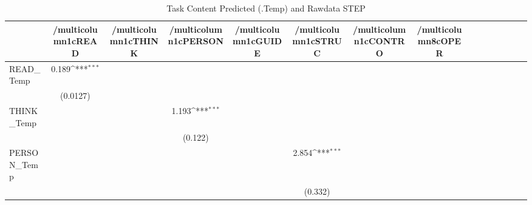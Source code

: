 \begin{table}[htbp]\centering
\def\sym#1{\ifmmode^{#1}\else\(^{#1}\)\fi}
\caption{Task Content Predicted (.Temp) and Rawdata STEP}
\begin{tabular}{l*{14}{c}}
\hline\hline
            &/multicolumn{1}{c}{READ}&/multicolumn{1}{c}{THINK}&/multicolumn{1}{c}{PERSON}&/multicolumn{1}{c}{GUIDE}&/multicolumn{1}{c}{STRUC}&/multicolumn{1}{c}{CONTRO}&/multicolumn{8}{c}{OPER}                                                                                                                                                       \\
\hline
READ\_Temp   &       0.189\sym{***}&                     &                     &                     &                     &                     &                     &                     &                     &                     &                     &                     &                     &                     \\
            &    (0.0127)         &                     &                     &                     &                     &                     &                     &                     &                     &                     &                     &                     &                     &                     \\
[1em]
THINK\_Temp  &                     &                     &       1.193\sym{***}&                     &                     &                     &                     &                     &                     &                     &                     &                     &                     &                     \\
            &                     &                     &     (0.122)         &                     &                     &                     &                     &                     &                     &                     &                     &                     &                     &                     \\
[1em]
PERSON\_Temp &                     &                     &                     &                     &       2.854\sym{***}&                     &                     &                     &                     &                     &                     &                     &                     &                     \\
            &                     &                     &                     &                     &     (0.332)         &                     &                     &                     &                     &                     &                     &                     &                     &                     \\

\end{tabular}
\end{table}
